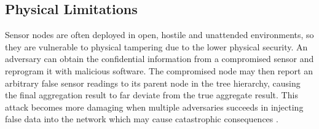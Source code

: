 	\subsection{Physical Limitations}
	Sensor nodes are often deployed in open, hostile and unattended environments, so they are vulnerable to physical tampering due to the lower physical security.
	An adversary can obtain the confidential information from a compromised sensor and reprogram it with malicious software.
	The compromised node may then report an arbitrary false sensor readings to its parent node in the tree hierarchy, causing the final aggregation result to far deviate from the true aggregate result.
	This attack becomes more damaging when multiple adversaries succeeds in injecting false data into the network which may cause catastrophic consequences \cite{wagner2007algorithms}.	

